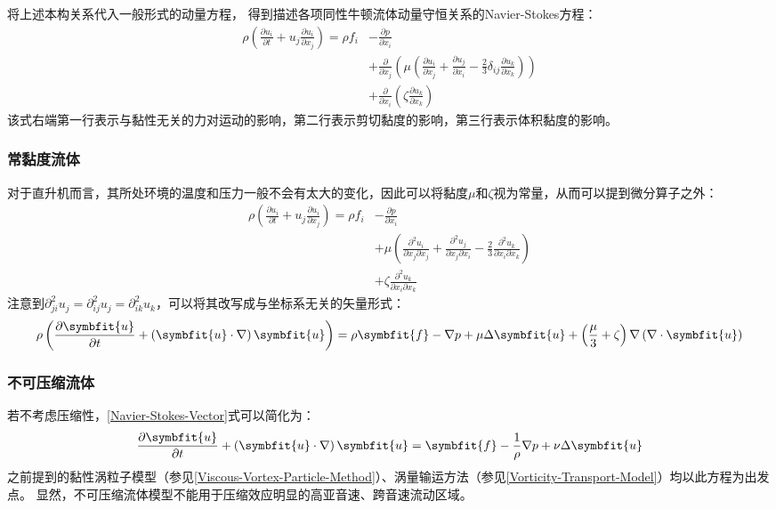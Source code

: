 将上述本构关系代入一般形式的动量方程，
得到描述各项同性牛顿流体动量守恒关系的Navier-Stokes方程：
\begin{equation}\label{Navier-Stokes}
\begin{split}
\rho\left( \frac{\partial u_i }{\partial t} + u_j \frac{\partial u_i}{\partial x_j}  \right)
= \rho f_i
& - \frac{\partial p }{\partial x_i} \\
& + \frac{ \partial }{\partial x_j} \left( \mu \left( \frac{\partial u_i}{\partial x_j} + \frac{\partial u_j}{\partial x_i} - \frac{2}{3} \delta_{ij} \frac{\partial u_k}{\partial x_k} \right) \right) \\
& + \frac{ \partial }{\partial x_i} \left( \zeta \frac{\partial u_k}{\partial x_k} \right)
\end{split}
\end{equation}
该式右端第一行表示与黏性无关的力对运动的影响，第二行表示剪切黏度的影响，第三行表示体积黏度的影响。

\subsubsection{常黏度流体}
对于直升机而言，其所处环境的温度和压力一般不会有太大的变化，因此可以将黏度$\mu$和$\zeta$视为常量，从而可以提到微分算子之外：
\begin{equation}
\begin{split}
\rho\left( \frac{\partial u_i }{\partial t} + u_j \frac{\partial u_i}{\partial x_j}  \right)
= \rho f_i
& - \frac{\partial p }{\partial x_i} \\
& + \mu \left( \frac{ \partial^2 u_i }{\partial x_j \partial x_j } +
                        \frac{ \partial^2 u_j }{\partial x_j \partial x_i } -
                        \frac{2}{3} \frac{\partial^2 u_k}{\partial x_i \partial x_k} \right) \\
& + \zeta \frac{\partial^2 u_k}{\partial x_i \partial x_k}
\end{split}
\end{equation}
注意到$\partial^2_{ji} u_j = \partial^2_{ij} u_j =\partial^2_{ik} u_k$，可以将其改写成与坐标系无关的矢量形式：
\begin{equation}\label{Navier-Stokes-Vector}
\rho \left( \frac{\partial \symbfit{u}}{\partial t} + \left(\symbfit{u}\cdot\nabla\right) \symbfit{u} \right)
=
\rho \symbfit{f}
-\nabla p
+\mu \Delta \symbfit{u}
+\left( \frac{\mu}{3} + \zeta \right) \nabla  \left(\nabla\cdot\symbfit{u}\right)
\end{equation}

\subsubsection{不可压缩流体}
若不考虑压缩性，\ref{Navier-Stokes-Vector}式可以简化为：
\begin{equation}
\frac{\partial \symbfit{u}}{\partial t} + \left(\symbfit{u}\cdot\nabla\right) \symbfit{u}
= \symbfit{f} -\frac{1}{\rho}\nabla p + \nu \Delta \symbfit{u}
\end{equation}
之前提到的黏性涡粒子模型（参见\ref{Viscous-Vortex-Particle-Method}）、涡量输运方法（参见\ref{Vorticity-Transport-Model}）均以此方程为出发点。
显然，不可压缩流体模型不能用于压缩效应明显的高亚音速、跨音速流动区域。

